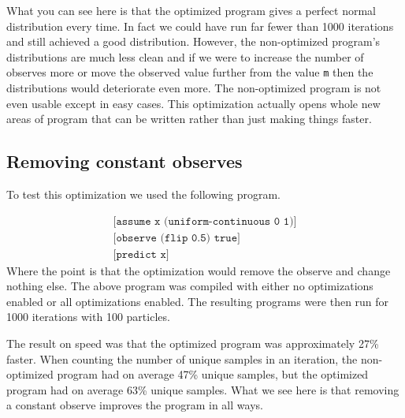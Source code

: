 \documentclass[a4paper]{article}
\begin{document}
What you can see here is that the optimized program gives a perfect normal distribution every time. In fact we could have run far fewer than 1000 iterations and still achieved a good distribution. However, the non-optimized program's distributions are much less clean and if we were to increase the number of observes more or move the observed value further from the value \texttt{m} then the distributions would deteriorate even more. The non-optimized program is not even usable except in easy cases. This optimization actually opens whole new areas of program that can be written rather than just making things faster.




\subsection{Removing constant observes}

To test this optimization we used the following program.

\[
	\begin{array}{l}
		\texttt{[assume x (uniform-continuous 0 1)]} \\
		\texttt{[observe (flip 0.5) true]} \\
		\texttt{[predict x]}
	\end{array}
\]
Where the point is that the optimization would remove the observe and change nothing else. The above program was compiled with either no optimizations enabled or all optimizations enabled. The resulting programs were then run for 1000 iterations with 100 particles.

The result on speed was that the optimized program was approximately 27\% faster. When counting the number of unique samples in an iteration, the non-optimized program had on average 47\% unique samples, but the optimized program had on average 63\% unique samples. What we see here is that removing a constant observe improves the program in all ways.



\end{document}
